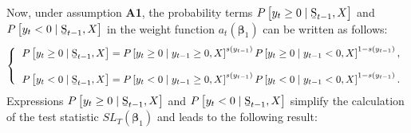 \documentclass[harvard,11pt]{article}
\begin{document}
Now, under assumption \textbf{A1}, the probability terms $P\left[
y_{t}\geq 0\mid \text{\b{S}}_{t-1},X\right] $ and $P\left[
y_{t}<0\mid \text{\b{S}}_{t-1},X\right] $ in the weight function $a_{t}(\bm{\beta}
_{1})$ can be written as follows:%
\begin{equation*}
\left\{ 
\begin{tabular}{l}
$P\left[ y_{t}\geq 0\mid \text{\b{S}}_{t-1},X\right] =P%
\left[ y_{t}\geq 0\mid y_{t-1}\geq 0,X\right] ^{s(y_{t-1})}P\left[
y_{t}\geq 0\mid y_{t-1}<0,X\right] ^{1-s(y_{t-1})},$ \\ 
\\ 
$P\left[ y_{t}<0\mid \text{\b{S}}_{t-1},X\right] =P\left[
y_{t}<0\mid y_{t-1}\geq 0,X\right] ^{s(y_{t-1})}P\left[ y_{t}<0\mid
y_{t-1}<0,X\right] ^{1-s(y_{t-1})}.$%
\end{tabular}%
\right. 
\end{equation*}%
Expressions $P\left[ y_{t}\geq 0\mid \text{%
\b{S}}_{t-1},X\right] $ and $P\left[ y_{t}<0\mid \text{\b{S}}%
_{t-1},X\right] $ simplify the calculation of the test statistic $%
SL_{T}(\bm{\beta}_{1})$ and leads to the following result:
\end{document}
